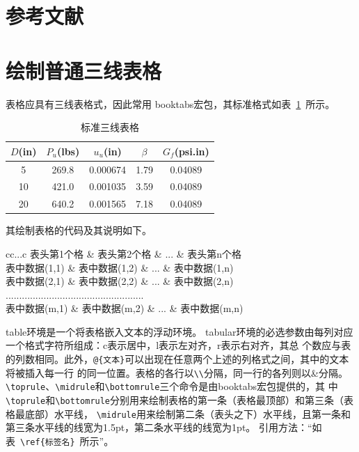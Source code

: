 \documentclass{cumcmthesis}
\begin{document}
\section{参考文献}

\section{绘制普通三线表格}
表格应具有三线表格式，因此常用 booktabs宏包，其标准格式如表~\ref{tab001}~所示。
\begin{table}[!htbp]
\caption{标准三线表格}\label{tab001} \centering
\begin{tabular}{ccccc}
\toprule[1.5pt]
$D$(in) & $P_u$(lbs) & $u_u$(in) & $\beta$ & $G_f$(psi.in)\\
\midrule[1pt]
 5 & 269.8 & 0.000674 & 1.79 & 0.04089\\
10 & 421.0 & 0.001035 & 3.59 & 0.04089\\
20 & 640.2 & 0.001565 & 7.18 & 0.04089\\
\bottomrule[1.5pt]
\end{tabular}
\end{table}

其绘制表格的代码及其说明如下。
\begin{tcode}
\begin{table}[!htbp]
\caption[标签名]{中文标题}
\begin{tabular}{cc...c}
\toprule[1.5pt]
表头第1个格   & 表头第2个格   & ... & 表头第n个格  \\
\midrule[1pt]
表中数据(1,1) & 表中数据(1,2) & ... & 表中数据(1,n)\\
表中数据(2,1) & 表中数据(2,2) & ... & 表中数据(2,n)\\
...................................................\\
表中数据(m,1) & 表中数据(m,2) & ... & 表中数据(m,n)\\
\bottomrule[1.5pt]
\end{tabular}
\end{table}
\end{tcode}

\bigskip
table环境是一个将表格嵌入文本的浮动环境。
tabular环境的必选参数由每列对应一个格式字符所组成：c表示居中，l表示左对齐，r表示右对齐，其总
个数应与表的列数相同。此外，\verb|@{文本}|可以出现在任意两个上述的列格式之间，其中的文本将被插入每一行
的同一位置。表格的各行以\verb|\\|分隔，同一行的各列则以\&分隔。
\verb|\toprule|、\verb|\midrule|和\verb|\bottomrule|三个命令是由booktabs宏包提供的，其
中\verb|\toprule|和\verb|\bottomrule|分别用来绘制表格的第一条（表格最顶部）和第三条（表格最底部）水平线，
\verb|\midrule|用来绘制第二条（表头之下）水平线，且第一条和第三条水平线的线宽为1.5pt，第二条水平线的线宽为1pt。
引用方法：“如表~\verb|\ref{标签名}|~所示”。
\end{document}
